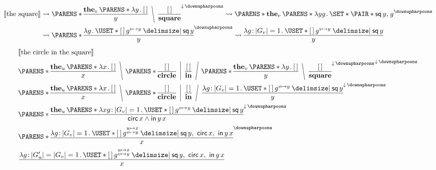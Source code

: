 \documentclass[10pt,fleqn]{article}
\begin{document}
\begin{minipage}[t]{0.5\textwidth} %
\begin{align*} %
  \sv{\textrm{the square}}
  &\leadsto
  \p{%
    \bitt{\textbf{the}_v\,\p{\l y \dt \hole}}{y}
    \BSL{%
    \bitt{\hole}{\textbf{square}}
    }
  }^{\dnar\,\reset}
  \leadsto
  \p{%
    \textbf{the}_v\,\p{\l yg \dt \set{\pair{\cn{sq}\,y}{g}}}
  }^\reset \\
  &\leadsto
  \p{%
    \bitt{\l g \dt \uset{\hole\,g^{v\mapsto y} \giv \cn{sq}\,y}}{y}
  }^\reset
  \leadsto
  \bitt{%
    \l g \col |G_v| = 1 \dt \uset{\hole\,g^{v\mapsto y} \giv \cn{sq}\,y}
  }{y}
\end{align*}
%
\vspace{3em}
%
\begin{align*} %
  &
  \sv{\textrm{the circle in the square}} \\
  &
  \p{%
    \bitt{\textbf{the}_u\,\p{\l x \dt \hole}}{x}
    \BSL{%
    \p{%
      \bitt{\hole}{\textbf{circle}}
      \MSL{%
      \bitt{\hole}{\textbf{in}}
      \FSL{%
      \p{%
        \bitt{\textbf{the}_v\,\p{\l y \dt \hole}}{y}
        \BSL{%
        \bitt{\hole}{\textbf{square}}
        }
      }^{\dnar\,\reset} } }
    } }
  }^{\dnar\,\reset} \\
  &
  \p{%
    \bitt{\textbf{the}_u\,\p{\l x \dt \hole}}{x}
    \BSL{%
    \p{%
      \bitt{\hole}{\textbf{circle}}
      \MSL{%
      \bitt{\hole}{\textbf{in}}
      \FSL{%
      \bitt{%
        \l g \col |G_v| = 1 \dt \uset{\hole\,g^{v\mapsto y} \giv \cn{sq}\,y}
      }{y}
      } }
    } }
  }^{\dnar\,\reset} \\
  &
  \p{%
    \bitt{%
      \textbf{the}_u\,\p{%
        \l xg \col |G_v| = 1 \dt \uset{\hole\,g^{v\mapsto y} \giv \cn{sq}\,y}
      }
    }{%
      \cn{circ}\,x \land \cn{in}\,y\,x
    }
  }^{\dnar\,\reset} \\
  &
  \p{%
    \bitt{%
      \l g \col |G_v| = 1 \dt
        \uset{%
          \hole\,g^{\substack{u\mapsto x\\ v\mapsto y}}
        \giv
          \cn{sq}\,y,\ \cn{circ}\,x,\ \cn{in}\,y\,x
        }
    }{x}
  }^\reset \\
  &
  \bitt{%
    \l g \col |G'_u| = |G_v| = 1 \dt
      \uset{%
        \hole\,g^{\substack{u\mapsto x\\ v\mapsto y}}
      \giv
        \cn{sq}\,y,\ \cn{circ}\,x,\ \cn{in}\,y\,x
      }
  }{x}
\end{align*}
\end{minipage}
\end{document}
